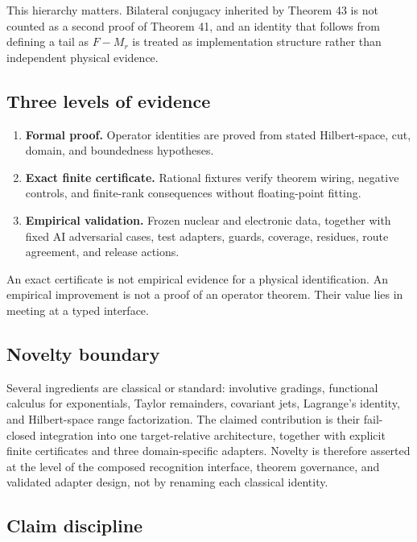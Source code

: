 This hierarchy matters. Bilateral conjugacy inherited by Theorem 43 is not counted as a second proof of Theorem 41, and an identity that follows from defining a tail as $F-M_r$ is treated as implementation structure rather than independent physical evidence.

\subsection{Three levels of evidence}

\begin{enumerate}[label=\textbf{E\arabic*.},leftmargin=2.7em]
\item \textbf{Formal proof.} Operator identities are proved from stated Hilbert-space, cut, domain, and boundedness hypotheses.
\item \textbf{Exact finite certificate.} Rational fixtures verify theorem wiring, negative controls, and finite-rank consequences without floating-point fitting.
\item \textbf{Empirical validation.} Frozen nuclear and electronic data, together with fixed AI adversarial cases, test adapters, guards, coverage, residues, route agreement, and release actions.
\end{enumerate}

An exact certificate is not empirical evidence for a physical identification. An empirical improvement is not a proof of an operator theorem. Their value lies in meeting at a typed interface.

\subsection{Novelty boundary}

Several ingredients are classical or standard: involutive gradings, functional calculus for exponentials, Taylor remainders, covariant jets, Lagrange's identity, and Hilbert-space range factorization. The claimed contribution is their fail-closed integration into one target-relative architecture, together with explicit finite certificates and three domain-specific adapters. Novelty is therefore asserted at the level of the composed recognition interface, theorem governance, and validated adapter design, not by renaming each classical identity.

\subsection{Claim discipline}

